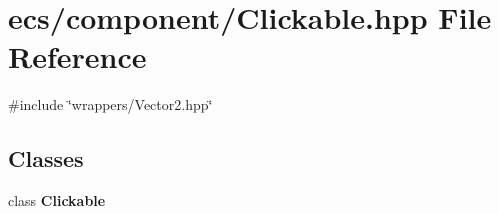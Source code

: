 \section{ecs/component/\+Clickable.hpp File Reference}
\label{_clickable_8hpp}
{\ttfamily \#include \char`\"{}wrappers/\+Vector2.\+hpp\char`\"{}}\newline
\subsection*{Classes}
\begin{DoxyCompactItemize}
\item 
class \textbf{ Clickable}
\end{DoxyCompactItemize}
